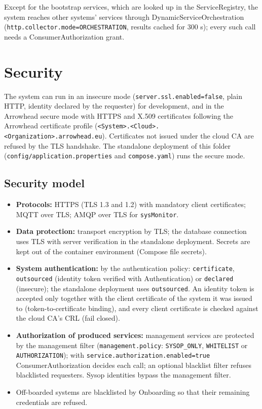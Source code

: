\documentclass[a4paper]{arrowhead}
\begin{document}
Except for the bootstrap services, which are looked up in the ServiceRegistry, the system reaches other systems' services through DynamicServiceOrchestration (\texttt{http.collector.mode=ORCHESTRATION}, results cached for 300 s); every such call needs a ConsumerAuthorization grant.

\newpage

\section{Security}
\label{sec:security}

The system can run in an insecure mode (\texttt{server.ssl.enabled=false}, plain HTTP, identity declared by the requester) for development, and in the Arrowhead secure mode with HTTPS and X.509 certificates following the Arrowhead certificate profile (\texttt{<System>.<Cloud>.<Organization>.arrowhead.eu}). Certificates not issued under the cloud CA are refused by the TLS handshake. The standalone deployment of this folder (\texttt{config/\allowbreak{}application.\allowbreak{}properties} and \texttt{compose.yaml}) runs the secure mode.

\subsection{Security model}


\begin{itemize}
  \item \textbf{Protocols:} HTTPS (TLS 1.3 and 1.2) with mandatory client certificates; MQTT over TLS; AMQP over TLS for \texttt{sysMonitor}.
  \item \textbf{Data protection:} transport encryption by TLS; the database connection uses TLS with server verification in the standalone deployment. Secrets are kept out of the container environment (Compose file secrets).
  \item \textbf{System authentication:} by the authentication policy: \texttt{certificate}, \texttt{outsourced} (identity token verified with Authentication) or \texttt{declared} (insecure); the standalone deployment uses \texttt{outsourced}. An identity token is accepted only together with the client certificate of the system it was issued to (token-to-certificate binding), and every client certificate is checked against the cloud CA's CRL (fail closed).
  \item \textbf{Authorization of produced services:} management services are protected by the management filter (\texttt{management.policy}: \texttt{SYSOP\_ONLY}, \texttt{WHITELIST} or \texttt{AUTHORIZATION}); with \texttt{service.authorization.enabled=true} ConsumerAuthorization decides each call; an optional blacklist filter refuses blacklisted requesters. Sysop identities bypass the management filter.
  \item Off-boarded systems are blacklisted by Onboarding so that their remaining credentials are refused.
\end{itemize}
\end{document}
